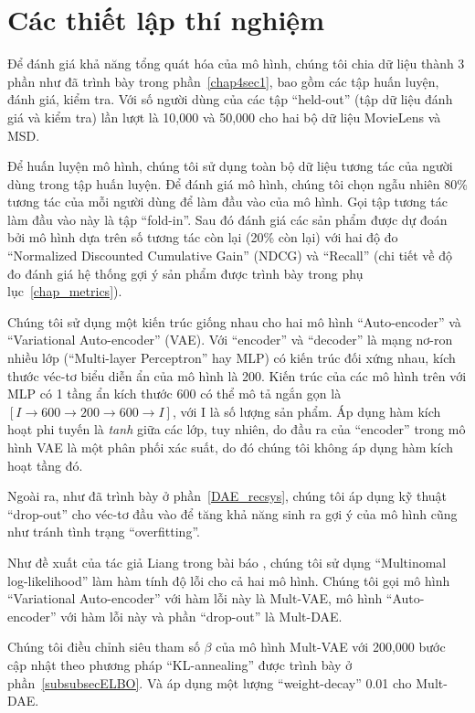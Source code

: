 \section{Các thiết lập thí nghiệm}
\label{setup_experiment}

Để đánh giá khả năng tổng quát hóa của mô hình, chúng tôi chia dữ liệu thành 3 phần như đã trình bày trong phần~\ref{chap4sec1}, bao gồm các tập huấn luyện, đánh giá, kiểm tra. Với số người dùng của các tập ``held-out'' (tập dữ liệu đánh giá và kiểm tra) lần lượt là 10,000 và 50,000 cho hai bộ dữ liệu MovieLens và MSD.

Để huấn luyện mô hình, chúng tôi sử dụng toàn bộ dữ liệu tương tác của người dùng trong tập huấn luyện. Để đánh giá mô hình, chúng tôi chọn ngẫu nhiên 80\% tương tác của mỗi người dùng để làm đầu vào của mô hình. Gọi tập tương tác làm đầu vào này là tập ``fold-in''. Sau đó đánh giá các sản phẩm được dự đoán bởi mô hình dựa trên số tương tác còn lại (20\% còn lại) với hai độ đo ``Normalized Discounted Cumulative Gain'' (NDCG) và ``Recall'' (chi tiết về độ đo đánh giá hệ thống gợi ý sản phẩm được trình bày trong phụ lục~\ref{chap_metrics}).

Chúng tôi sử dụng một kiến trúc giống nhau cho hai mô hình ``Auto-encoder'' và ``Variational Auto-encoder'' (VAE). Với ``encoder'' và ``decoder'' là mạng nơ-ron nhiều lớp (``Multi-layer Perceptron'' hay MLP) có kiến trúc đối xứng nhau, kích thước véc-tơ biểu diễn ẩn của mô hình là 200. Kiến trúc của các mô hình trên với MLP có 1 tầng ẩn kích thước 600 có thể mô tả ngắn gọn là $[ I \to 600 \to 200 \to 600 \to I ]$, với I là số lượng sản phẩm. Áp dụng hàm kích hoạt phi tuyến là \textit{tanh} giữa các lớp, tuy nhiên, do đầu ra của ``encoder'' trong mô hình VAE là một phân phối xác suất, do đó chúng tôi không áp dụng hàm kích hoạt tầng đó.

Ngoài ra, như đã trình bày ở phần~\ref{DAE_recsys}, chúng tôi áp dụng kỹ thuật ``drop-out'' cho véc-tơ đầu vào để tăng khả năng sinh ra gợi ý của mô hình cũng như tránh tình trạng ``overfitting''.

Như đề xuất của tác giả Liang trong bài báo \cite{mvae}, chúng tôi sử dụng ``Multinomal log-likelihood'' làm hàm tính độ lỗi cho cả hai mô hình. Chúng tôi gọi mô hình ``Variational Auto-encoder'' với hàm lỗi này là Mult-VAE, mô hình ``Auto-encoder'' với hàm lỗi này và phần ``drop-out'' là Mult-DAE.

Chúng tôi điều chỉnh siêu tham số $\beta$ của mô hình Mult-VAE với 200,000 bước cập nhật theo phương pháp ``KL-annealing'' được trình bày ở phần~\ref{subsubsecELBO}. Và áp dụng một lượng ``weight-decay'' 0.01 cho Mult-DAE. 

